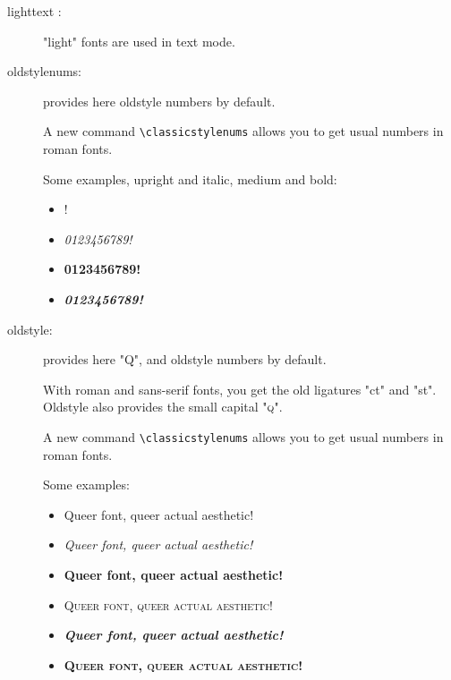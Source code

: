 \documentclass[a4paper,11pt]{article}
\begin{document}
\begin{description}

	\item[lighttext :] "light" fonts are used in text mode.

	\item[oldstylenums:] provides here
		oldstyle numbers by default. 
		
		A new command \verb=\classicstylenums= allows you to get usual numbers in roman fonts.
		
		Some examples, upright and italic, medium and bold:
		
			\begin{itemize}
				\item {!}
				\item {\selectfont \textit{0123456789!}}
				\item {\selectfont \textbf{0123456789!}}
				\item {\selectfont \textbf{\textit{0123456789!}}}
			\end{itemize}

	\item[oldstyle:] provides here {\selectfont "Q"}, 
		and oldstyle numbers by default. 
		
		With roman and sans-serif fonts, you get the old ligatures {\selectfont "ct"} 
		and {\selectfont "st"}.
		Oldstyle also provides the small capital  {\selectfont "\textsc{q}"}.
		
		A new command \verb=\classicstylenums= allows you to get usual numbers in roman fonts.
		
		Some examples:
		
			\begin{itemize}
				\item {\selectfont Queer font, queer actual aesthetic!}
				\item {\selectfont \textit{Queer font, queer actual aesthetic!}}
				\item {\selectfont \textbf{Queer font, queer actual aesthetic!}}
				\item {\selectfont \textsc{Queer font, queer actual aesthetic!}}
				\item {\selectfont \textbf{\textit{Queer font, queer actual aesthetic!}}}
				\item {\selectfont \textsc{\textbf{Queer font, queer actual aesthetic!}}}
			\end{itemize}
			

\end{description}
\end{document}
